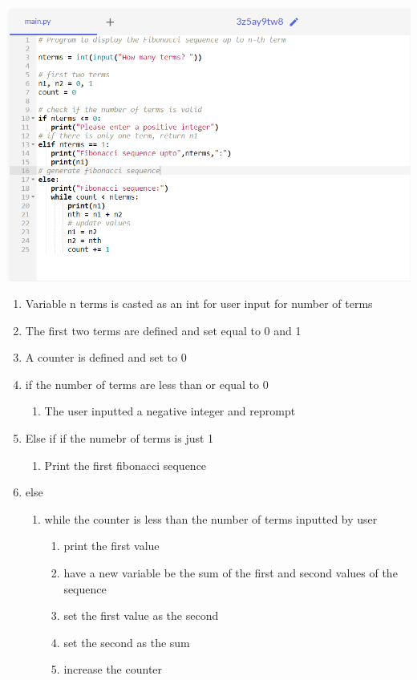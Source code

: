 \documentclass[12pt, letterpaper]{article}
\begin{document}
\begin{enumerate}
    \includegraphics[scale = 0.5]{fibcode.PNG}
    \begin{enumerate}
      \item Variable n terms is casted as an int for user input for number of terms
      \item The first two terms are defined and set equal to 0 and 1
      \item A counter is defined and set to 0
      \item if the number of terms are less than or equal to 0
      \begin{enumerate}
        \item The user inputted a negative integer and reprompt
      \end{enumerate}
      \item Else if if the numebr of terms is just 1
      \begin{enumerate}
        \item Print the first fibonacci sequence
      \end{enumerate}
    \item else
    \begin{enumerate}
      \item while the counter is less than the number of terms inputted by user
      \begin{enumerate}
        \item print the first value
        \item have a new variable be the sum of the first and second values of the sequence
        \item set the first value as the second
        \item set the second as the sum
        \item increase the counter

\end{enumerate}
\end{enumerate}
\end{enumerate}
\end{enumerate}
\end{document}
